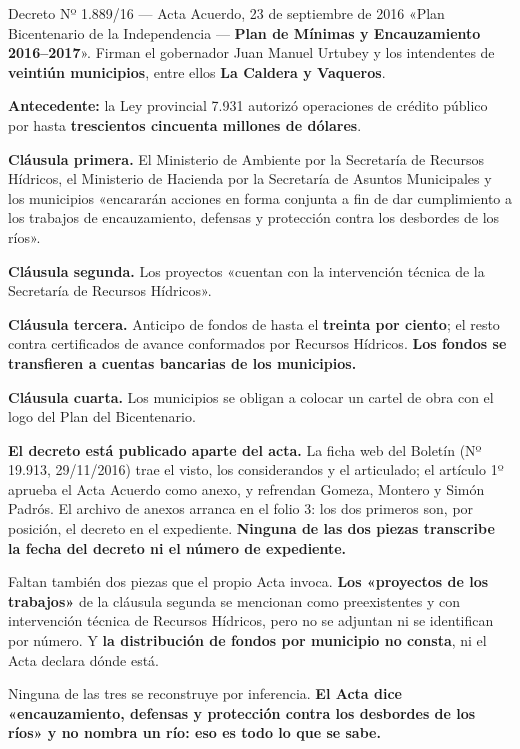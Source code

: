 \begin{ficha}{Decreto Nº 1.889/16 --- Acta Acuerdo, 23 de septiembre de 2016}
«Plan Bicentenario de la Independencia --- \textbf{Plan de Mínimas y Encauzamiento
2016--2017}». Firman el gobernador Juan Manuel Urtubey y los intendentes de \textbf{veintiún
municipios}, entre ellos \textbf{La Caldera y Vaqueros}.

\textbf{Antecedente:} la Ley provincial 7.931 autorizó operaciones de crédito público por
hasta \textbf{trescientos cincuenta millones de dólares}.

\textbf{Cláusula primera.} El Ministerio de Ambiente por la Secretaría de Recursos Hídricos,
el Ministerio de Hacienda por la Secretaría de Asuntos Municipales y los municipios
«encararán acciones en forma conjunta a fin de dar cumplimiento a los trabajos de
encauzamiento, defensas y protección contra los desbordes de los ríos».

\textbf{Cláusula segunda.} Los proyectos «cuentan con la intervención técnica de la Secretaría
de Recursos Hídricos».

\textbf{Cláusula tercera.} Anticipo de fondos de hasta el \textbf{treinta por ciento}; el resto
contra certificados de avance conformados por Recursos Hídricos. \textbf{Los fondos se
transfieren a cuentas bancarias de los municipios.}

\textbf{Cláusula cuarta.} Los municipios se obligan a colocar un cartel de obra con el logo
del Plan del Bicentenario.
\end{ficha}

\begin{cautela}
\textbf{El decreto está publicado aparte del acta.} La ficha web del Boletín (Nº 19.913,
29/11/2016) trae el visto, los considerandos y el articulado; el artículo 1º aprueba el Acta
Acuerdo como anexo, y refrendan Gomeza, Montero y Simón Padrós. El archivo de anexos arranca
en el folio 3: los dos primeros son, por posición, el decreto en el expediente.
\textbf{Ninguna de las dos piezas transcribe la fecha del decreto ni el número de expediente.}

Faltan también dos piezas que el propio Acta invoca. \textbf{Los «proyectos de los trabajos»}
de la cláusula segunda se mencionan como preexistentes y con intervención técnica de Recursos
Hídricos, pero no se adjuntan ni se identifican por número. Y \textbf{la distribución de fondos
por municipio no consta}, ni el Acta declara dónde está.

Ninguna de las tres se reconstruye por inferencia. \textbf{El Acta dice «encauzamiento,
defensas y protección contra los desbordes de los ríos» y no nombra un río: eso es todo lo que
se sabe.}
\end{cautela}

